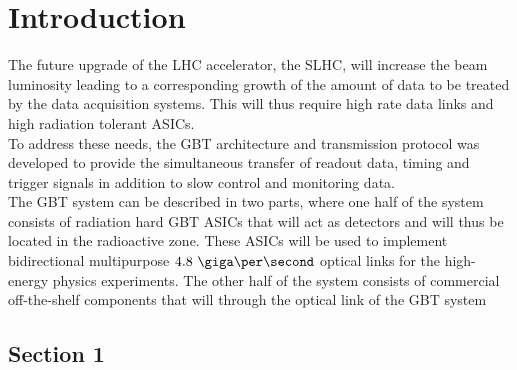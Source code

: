 \documentclass[main.tex]{subfiles}
\begin{document}
\chapter{Introduction}

The future upgrade of the LHC accelerator, the SLHC, will increase the beam luminosity leading to a corresponding growth of the amount of data to be treated by the data acquisition systems. This will thus require high rate data links and high radiation tolerant ASICs.\\
To address these needs, the GBT architecture and transmission protocol was developed to provide the simultaneous transfer of readout data, timing and trigger signals in addition to slow control and monitoring data. \\
The GBT system can be described in two parts, where one half of the system consists of radiation hard GBT ASICs that will act as detectors and will thus be located in the radioactive zone. These ASICs will be used to implement bidirectional multipurpose $4.8\ \giga\per\second$ optical links for the high-energy physics experiments. The other half of the system consists of commercial off-the-shelf components that will through the optical link of the GBT system 


\section{Section 1}
\end{document}
